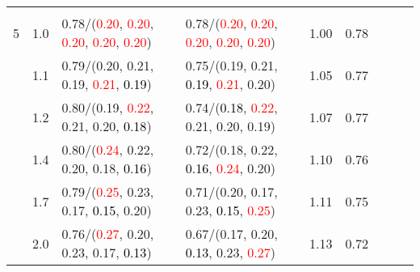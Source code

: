 \documentclass[10pt,a4paper]{report}
\begin{document}
\begin{table}[!htbp]
\begin{center}
{\begin{tabular}{ccllccccc}
				  &                                   &                                                                                                                                                 &                                                                                                                                                 &                                             \\
				5 & 1.0                               & 0.78/(\textcolor{red}{0.20}, \textcolor{red}{0.20}, \textcolor{red}{0.20}, \textcolor{red}{0.20}, \textcolor{red}{0.20})                        & 0.78/(\textcolor{red}{0.20}, \textcolor{red}{0.20}, \textcolor{red}{0.20}, \textcolor{red}{0.20}, \textcolor{red}{0.20})                        & 1.00             & 0.78                     \\
				  & 1.1                               & 0.79/(0.20, 0.21, 0.19, \textcolor{red}{0.21}, \textcolor{black}{0.19})                                                                         & 0.75/(0.19, 0.21, \textcolor{black}{0.19}, \textcolor{red}{0.21}, 0.20)                                                                         & 1.05             & 0.77                     \\
				  & 1.2                               & 0.80/(0.19, \textcolor{red}{0.22}, 0.21, 0.20, \textcolor{black}{0.18})                                                                         & 0.74/(\textcolor{black}{0.18}, \textcolor{red}{0.22}, 0.21, 0.20, 0.19)                                                                         & 1.07             & 0.77                     \\
				  & 1.4                               & 0.80/(\textcolor{red}{0.24}, 0.22, 0.20, 0.18, \textcolor{black}{0.16})                                                                         & 0.72/(0.18, 0.22, \textcolor{black}{0.16}, \textcolor{red}{0.24}, 0.20)                                                                         & 1.10             & 0.76                     \\
				  & 1.7                               & 0.79/(\textcolor{red}{0.25}, 0.23, 0.17, \textcolor{black}{0.15}, 0.20)                                                                         & 0.71/(0.20, 0.17, 0.23, \textcolor{black}{0.15}, \textcolor{red}{0.25})                                                                         & 1.11             & 0.75                     \\
				  & 2.0                               & 0.76/(\textcolor{red}{0.27}, 0.20, 0.23, 0.17, \textcolor{black}{0.13})                                                                         & 0.67/(0.17, 0.20, \textcolor{black}{0.13}, 0.23, \textcolor{red}{0.27})                                                                         & 1.13             & 0.72                     \\

\end{tabular}}
\end{center}
\end{table}
\end{document}
